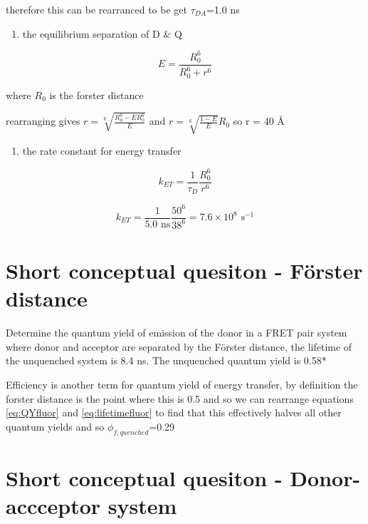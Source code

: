 \documentclass[
]{book}
\providecommand{\tightlist}{%
  \setlength{\itemsep}{0pt}\setlength{\parskip}{0pt}}
\begin{document}
therefore this can be rearranced to be get \(\tau_{DA}\)=1.0 ns

\begin{enumerate}
\def\labelenumi{\arabic{enumi}.}
\tightlist
\item
  the equilibrium separation of D \& Q
\end{enumerate}

\begin{equation}
E = \frac{R_0^6}{R_0^6+r^6}
\label{eq:forsterdistance}
\end{equation}

where \(R_0\) is the forster distance

rearranging gives \(r = \sqrt[6]{\frac{R_0^6-ER_0^6}{E}}\) and \(r = \sqrt[6]{\frac{1-E}{E}}R_0\) so r = 40 Å

\begin{enumerate}
\def\labelenumi{\arabic{enumi}.}
\tightlist
\item
  the rate constant for energy transfer
\end{enumerate}

\begin{equation}
k_{ET}=\frac{1}{\tau_D}\frac{R_0^6}{r^6}
\label{eq:forsterrate}
\end{equation}

\begin{equation*}
k_{ET}=\frac{1}{5.0 \textrm{ ns}}\frac{50^6}{38^6} = 7.6 \times 10^8 \textrm{ s}^{-1}
\end{equation*}

\hypertarget{sec:FRETdist}{%
\section{Short conceptual quesiton - Förster distance}\label{sec:FRETdist}}

Determine the quantum yield of emission of the donor in a FRET pair system where donor and acceptor are separated by the Förster distance, the lifetime of the unquenched system is 8.4 ns. The unquenched quantum yield is 0.58*

Efficiency is another term for quantum yield of energy transfer, by definition the forster distance is the point where this is 0.5 and so we can rearrange equations \eqref{eq:QYfluor} and \eqref{eq:lifetimefluor} to find that this effectively halves all other quantum yields and so \(\phi_{f, quenched}\)=0.29

\hypertarget{sec:donoracceptor}{%
\section{Short conceptual quesiton - Donor-accceptor system}\label{sec:donoracceptor}}
\end{document}
